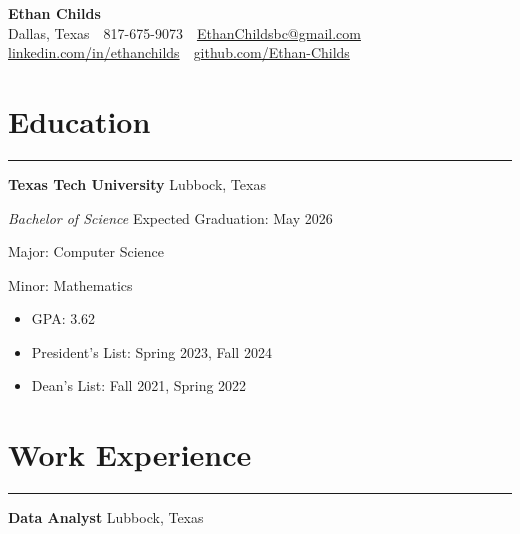 \documentclass[a4paper,11pt]{article}
\begin{document}
\begin{center}
    {\Huge \textbf{Ethan Childs}} \\
    \vspace{0pt}
    Dallas, Texas
    \,\textbar\, 
    817-675-9073 
    \,\textbar\,
    \href{mailto:EthanChildsbc@gmail.com.com}{EthanChildsbc@gmail.com}
    \,\textbar\, 
    \href{https://linkedin.com/in/ethanchilds}{linkedin.com/in/ethanchilds}
    \,\textbar\, 
    \href{https://github.com/Ethan-Childs}{github.com/Ethan-Childs}
    
\end{center}
\vspace{-0.9em}
\section*{Education}
\vspace{-0.8em}
\rule{\linewidth}{2pt}
\textbf{Texas Tech University} \hfill Lubbock, Texas 

\textit{Bachelor of Science} \hfill Expected Graduation: May 2026

Major: Computer Science

Minor: Mathematics
\vspace{-0.8em}
\begin{itemize}
    \item GPA: 3.62
    \vspace{-0.8em}
    \item President’s List: Spring 2023, Fall 2024
    \vspace{-0.8em}
    \item Dean’s List: Fall 2021, Spring 2022
\end{itemize}
\vspace{-0.5em}
\vspace{-0.5em}
\section*{Work Experience}
\vspace{-0.8em}
\rule{\linewidth}{2pt}

\textbf{Data Analyst} \hfill Lubbock, Texas
\end{document}
